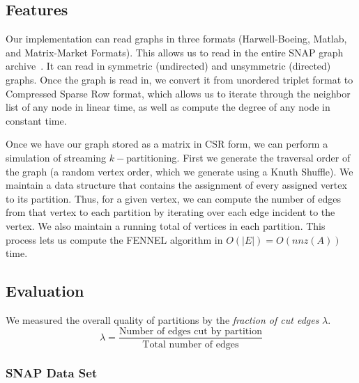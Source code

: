 \documentclass[11pt]{article}
\begin{document}
\subsection{Features}
Our implementation can read graphs in three formats (Harwell-Boeing, Matlab, and Matrix-Market Formats). This allows us to read in the entire SNAP graph archive~\cite{Leskovec-data}. It can read in symmetric (undirected) and unsymmetric (directed) graphs. Once the graph is read in, we convert it from unordered triplet format to Compressed Sparse Row format, which allows us to iterate through the neighbor list of any node in linear time, as well as compute the degree of any node in constant time.

Once we have our graph stored as a matrix in CSR form, we can perform a simulation of streaming $k-$partitioning. First we generate the traversal order of the graph (a random vertex order, which we generate using a Knuth Shuffle). We maintain a data structure that contains the assignment of every assigned vertex to its partition. Thus, for a given vertex, we can compute the number of edges from that vertex to each partition by iterating over each edge incident to the vertex. We also maintain a running total of vertices in each partition. This process lets us compute the FENNEL algorithm in $O(|E|)=O(nnz(A))$ time. 

\subsection{Evaluation}

We measured the overall quality of partitions by the \textit{fraction of cut edges} $\lambda$.
\[\lambda = \frac{\text{Number of edges cut by partition}}{\text{Total number of edges}}\]

\subsubsection{SNAP Data Set}
\end{document}
